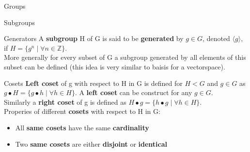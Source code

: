 \documentclass[12pt, letterpaper]{article}
\begin{document}
\begin{section}{Groups}
\begin{subsection}{Subgroups}
    \begin{subsubsection}{Generators}
      A \textbf{subgroup} H of G is said to be \textbf{generated} by \(g \in G\),
      denoted \(\langle g \rangle\), if \(H = \{ g^{n} \; | \; \forall n \in \mathbb{Z} \}\). \\
      More generally for every subset of G a subgroup generated by all elements
      of this subset can be defined (this idea is very similar to baisis for a
      vectorspace).
    \end{subsubsection}

  \end{subsection}

  \begin{subsection}{Cosets}
    \textbf{Left coset} of g with respect to H in G is defined for \(H < G\)
    and \(g \in G\) as \(g \bullet H = \{{} g \bullet h \; | \; \forall h \in H \}{}\).
    A \textbf{left coset} can be construct for any \(g \in G\). \\
    Similarly a \textbf{right coset} of g is defined as
    \(H \bullet g = \{{} h \bullet g \; | \; \forall h \in H \}{}\). \\
    Properies of different \textbf{cosets} with respect to H in G:
    \begin{itemize}
      \item All \textbf{same cosets} have the same \textbf{cardinality}
      \item Two \textbf{same cosets} are either \textbf{disjoint} or \textbf{identical}
    \end{itemize}
  \end{subsection}

\end{section}
\end{document}

